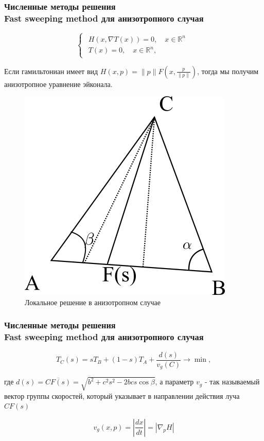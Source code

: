\documentclass[hyperref={unicode=true},professionalfont]{beamer}
\newcommand{\stamp}{
	\begin{frame}[plain,noframenumbering]
		\begin{table}[h!]
			\flushright
			\vspace{5cm}
			\begin{adjustbox}{max width=0.7\textwidth}
				\begin{tabular}{
					|>{\footnotesize}p{0.8cm}|
					>{\footnotesize}p{0.8cm}|
					>{\footnotesize}p{2.2cm}|
					>{\footnotesize}p{1.1cm}|
					>{\footnotesize}p{0.8cm}|
					>{\footnotesize}p{5cm}|
					>{\footnotesize}p{0.1cm}|
					>{\footnotesize}p{0.1cm}|
					>{\footnotesize}p{0.1cm}|
					>{\footnotesize}p{0.8cm}|
					>{\footnotesize}p{1.4cm}|
				}
					\hline
					&&&&& \multicolumn{6}{>{\footnotesize}c|}{\multirow{3}{*}{\Large 0.043.00.00 ПЗ}} \\ \cline{1-5}
					&&&&& \multicolumn{6}{>{\footnotesize}c|}{} \\ \cline{1-5}
					Изм. & Лист & № Документа & Подпись & Дата & \multicolumn{6}{>{\footnotesize}c|}{} \\ \hline
					\multicolumn{2}{|>{\footnotesize}l|}{Разработал}
                    & Апанович Д.В. &  &  &
                                            \multirow{4}{5cm}{\centering
                                            Параллельный алгоритм
                                            численного решения
                                            анизотропного уравнения эйконала} & \multicolumn{3}{>{\footnotesize}l|}{Лит.} & Лист & Листов \\ \cline{1-5}\cline{7-11}
					\multicolumn{2}{|>{\footnotesize}l|}{Проверил}
                    & Казаков А.Л. &  &  &  & У & & & \insertframenumber & \inserttotalframenumber \\ \cline{1-5}\cline{7-11}
					\multicolumn{2}{|>{\footnotesize}l|}{Нормоконтролер}
                    & Казаков А.Л. &  &  &  & \multicolumn{5}{>{\footnotesize}l|}{} \\ \cline{1-5}
					\multicolumn{2}{|>{\footnotesize}l|}{} &  &  &  &  & \multicolumn{5}{>{\footnotesize}l|}{Кафедра АС, гр. ИСТм-16-1} \\ \cline{1-5}
					\multicolumn{2}{|>{\footnotesize}l|}{Утвердил}
                    & Бахвалов С.В. &  &  &  & \multicolumn{5}{>{\footnotesize}l|}{} \\ \hline

				\end{tabular}
			\end{adjustbox}
		\end{table}

	\end{frame}
}
\renewcommand{\stamp}{}
\begin{document}
\begin{frame}
  \frametitle{Численные методы решения \\
Fast sweeping method для анизотропного случая}


\begin{equation}
  \label{eq:hje}
  \begin{cases}
    \begin{array}{ll}
      H(x, \nabla T(x)) = 0,\quad x \in \mathbb{R}^n  \\
      T(x) = 0, \quad  x \in \mathbb{R}^n,
    \end{array}
  \end{cases}
\end{equation}

Если гамильтониан имеет вид $H(x,p) = \|p\| F(x, \frac{p}{\|p\|})$,
тогда мы получим анизотропное уравнение эйконала.


\begin{figure}[H]
  \centering
  \includegraphics[width=0.3\linewidth]{anisotropy.png}
  \hfil \caption{Локальное решение в анизотропном случае}
  \label{fig:triangle-front}

\end{figure}


\end{frame}
\stamp


\begin{frame}
  \frametitle{Численные методы решения \\
Fast sweeping method для анизотропного случая}

\begin{equation}
  \label{eq:2}
  T_C(s) = sT_B + (1-s)T_A + \frac{d(s)}{v_g(C)} \rightarrow \min,
\end{equation}

где $d(s) = \overline{CF(s)} = \sqrt{b^2+c^2s^2-2bcs \cos \beta}$, а
параметр $v_g$ - так называемый вектор группы скоростей, который
указывает в направлении действия луча $CF(s)$

\begin{equation}
  \label{eq:3}
  v_g(x,p) = \left| \frac{dx}{dt} \right| = \left| \nabla_p H  \right|
\end{equation}


\end{frame}
\stamp
\end{document}
